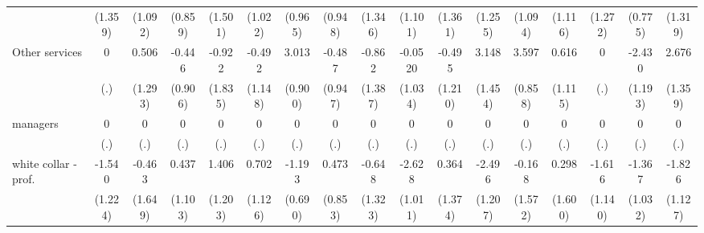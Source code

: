 {\begin{tabular}{l*{16}{c}}
                    &     (1.359)         &     (1.092)         &     (0.859)         &     (1.501)         &     (1.022)         &     (0.965)         &     (0.948)         &     (1.346)         &     (1.101)         &     (1.361)         &     (1.255)         &     (1.094)         &     (1.116)         &     (1.272)         &     (0.775)         &     (1.319)         \\
[1em]
Other services      &           0         &       0.506         &      -0.446         &      -0.922         &      -0.492         &       3.013\sym{***}&      -0.487         &      -0.862         &     -0.0520         &      -0.495         &       3.148\sym{*}  &       3.597\sym{***}&       0.616         &           0         &      -2.430\sym{*}  &       2.676\sym{*}  \\
                    &         (.)         &     (1.293)         &     (0.906)         &     (1.835)         &     (1.148)         &     (0.900)         &     (0.947)         &     (1.387)         &     (1.034)         &     (1.210)         &     (1.454)         &     (0.858)         &     (1.115)         &         (.)         &     (1.193)         &     (1.359)         \\
[1em]
managers            &           0         &           0         &           0         &           0         &           0         &           0         &           0         &           0         &           0         &           0         &           0         &           0         &           0         &           0         &           0         &           0         \\
                    &         (.)         &         (.)         &         (.)         &         (.)         &         (.)         &         (.)         &         (.)         &         (.)         &         (.)         &         (.)         &         (.)         &         (.)         &         (.)         &         (.)         &         (.)         &         (.)         \\
[1em]
white collar - prof.&      -1.540         &      -0.463         &       0.437         &       1.406         &       0.702         &      -1.193         &       0.473         &      -0.648         &      -2.628\sym{**} &       0.364         &      -2.496\sym{*}  &      -0.168         &       0.298         &      -1.616         &      -1.367         &      -1.826         \\
                    &     (1.224)         &     (1.649)         &     (1.103)         &     (1.203)         &     (1.126)         &     (0.690)         &     (0.853)         &     (1.323)         &     (1.011)         &     (1.374)         &     (1.207)         &     (1.572)         &     (1.600)         &     (1.140)         &     (1.032)         &     (1.127)         \\

\end{tabular}}

